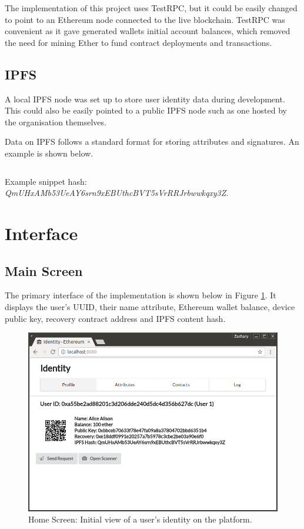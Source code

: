The implementation of this project uses TestRPC, but it could be easily changed to point to an Ethereum node connected to the live blockchain. TestRPC was convenient as it gave generated wallets initial account balances, which removed the need for mining Ether to fund contract deployments and transactions.

\subsection{IPFS}
A local \ac{IPFS} node was set up to store user identity data during development. This could also be easily pointed to a public \ac{IPFS} node such as one hosted by the organisation themselves.

Data on \ac{IPFS} follows a standard format for storing attributes and signatures. An example is shown below.

\begin{spacing}{1}
  \inputminted{json}{./code/IPFS.json.txt}
\end{spacing}
Example snippet hash: \textit{QmUHxAMb53UeAY6srn9xEBUthcBVT5sVrRRJrbwwkqxy3Z}.

\section{Interface}
\subsection{Main Screen}
The primary interface of the implementation is shown below in Figure \ref{fig:home-screen}. It displays the user's \ac{UUID}, their name attribute, Ethereum wallet balance, device public key, recovery contract address and \ac{IPFS} content hash.

\begin{figure}[ht]
\centering
     \includegraphics[width=1.0\textwidth]{./images/HomeScreen.png}
      \caption{Home Screen: Initial view of a user's identity on the platform.}
       \label{fig:home-screen}
\end{figure}

